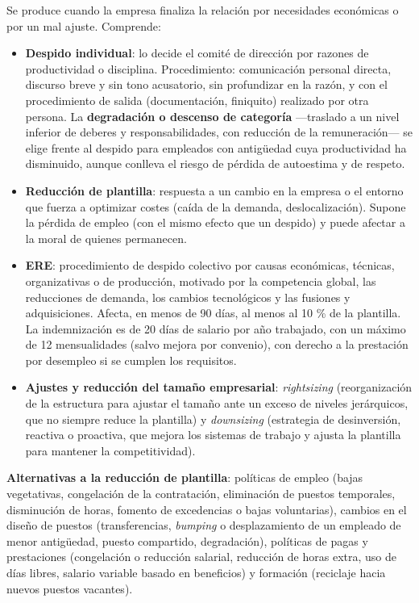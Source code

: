 \documentclass[12pt]{book} %
\providecommand{\tightlist}{%
  \setlength{\itemsep}{0pt}\setlength{\parskip}{0pt}}
\begin{document}
Se produce cuando la empresa finaliza la relación por necesidades
económicas o por un mal ajuste. Comprende:

\begin{itemize}
\tightlist
\item
  \textbf{Despido individual}: lo decide el comité de dirección por
  razones de productividad o disciplina. Procedimiento: comunicación
  personal directa, discurso breve y sin tono acusatorio, sin
  profundizar en la razón, y con el procedimiento de salida
  (documentación, finiquito) realizado por otra persona. La
  \textbf{degradación o descenso de categoría} ---traslado a un nivel
  inferior de deberes y responsabilidades, con reducción de la
  remuneración--- se elige frente al despido para empleados con
  antigüedad cuya productividad ha disminuido, aunque conlleva el riesgo
  de pérdida de autoestima y de respeto.
\item
  \textbf{Reducción de plantilla}: respuesta a un cambio en la empresa o
  el entorno que fuerza a optimizar costes (caída de la demanda,
  deslocalización). Supone la pérdida de empleo (con el mismo efecto que
  un despido) y puede afectar a la moral de quienes permanecen.
\item
  \textbf{ERE}: procedimiento de despido colectivo por causas
  económicas, técnicas, organizativas o de producción, motivado por la
  competencia global, las reducciones de demanda, los cambios
  tecnológicos y las fusiones y adquisiciones. Afecta, en menos de 90
  días, al menos al 10 \% de la plantilla. La indemnización es de 20
  días de salario por año trabajado, con un máximo de 12 mensualidades
  (salvo mejora por convenio), con derecho a la prestación por desempleo
  si se cumplen los requisitos.
\item
  \textbf{Ajustes y reducción del tamaño empresarial}:
  \emph{rightsizing} (reorganización de la estructura para ajustar el
  tamaño ante un exceso de niveles jerárquicos, que no siempre reduce la
  plantilla) y \emph{downsizing} (estrategia de desinversión, reactiva o
  proactiva, que mejora los sistemas de trabajo y ajusta la plantilla
  para mantener la competitividad).
\end{itemize}

\textbf{Alternativas a la reducción de plantilla}: políticas de empleo
(bajas vegetativas, congelación de la contratación, eliminación de
puestos temporales, disminución de horas, fomento de excedencias o bajas
voluntarias), cambios en el diseño de puestos (transferencias,
\emph{bumping} o desplazamiento de un empleado de menor antigüedad,
puesto compartido, degradación), políticas de pagas y prestaciones
(congelación o reducción salarial, reducción de horas extra, uso de días
libres, salario variable basado en beneficios) y formación (reciclaje
hacia nuevos puestos vacantes).
\end{document}
